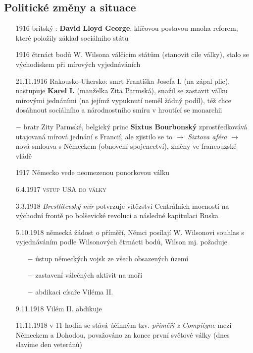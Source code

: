 \documentclass{article}
\begin{document}
\subsection*{Politické změny a situace}
\begin{itemize}
    \vspace{-0.5em}
    \setlength\itemsep{0.15em}
    \item[1916] britský : \textbf{David Lloyd George}, klíčovou postavou mnoha reforem, které položily základ sociálního státu
    \item[1916] čtrnáct bodů W. Wilsona válčícím státům (stanovit cíle války), stalo se východiskem při mírových vyjednáváních
    \item[21.11.1916] Rakousko-Uhersko: smrt Františka Josefa I. (na zápal plic), nastupuje \textbf{Karel I.} (manželka Zita Parmská), snažil se zastavit válku mírovými jednáními (na jejímž vypuknutí neměl žádný podíl), též chce dosáhnout sociálního a národnostního smíru v hroutící se monarchii
    \item[$-$] bratr Zity Parmské, belgický princ \textbf{Sixtus Bourbonský} zprostředkovává utajovaná mírová jednání s Francií, ale zjistilo se to $\rightarrow$ \textit{Sixtova aféra} $\rightarrow$  nová smlouva s Německem (obnovení spojenectví), změny ve francouzské vládě
    \item[1917] Německo vede neomezenou ponorkovou válku
    \item[6.4.1917] \textsc{vstup USA do války}
    \item[3.3.1918] \textit{Brestlitevský mír} potvrzuje vítězství Centrálních mocností na východní frontě po bolševické revoluci a následné kapitulaci Ruska
    \item[5.10.1918] německá žádost o příměří, Němci posílají W. Wilsonovi souhlas s vyjednáváním podle Wilsonových čtrnácti bodů, Wilson mj. požaduje \begin{itemize}
        \vspace{-0.5em}
        \setlength\itemsep{0.15em}
        \item[$-$] ústup německých vojsk ze všech obsazených území
        \item[$-$] zastavení válečných aktivit na moři
        \item[$-$] abdikaci císaře Viléma II.
    \end{itemize}
    \item[9.11.1918]  Vilém II. abdikuje
    \item[11.11.1918] v 11 hodin se stává účinným tzv. \textit{příměří z Compiègne} mezi Německem a Dohodou, považováno za konec první světové války (dnes slavíme den veteránů)
\end{itemize}
\end{document}

